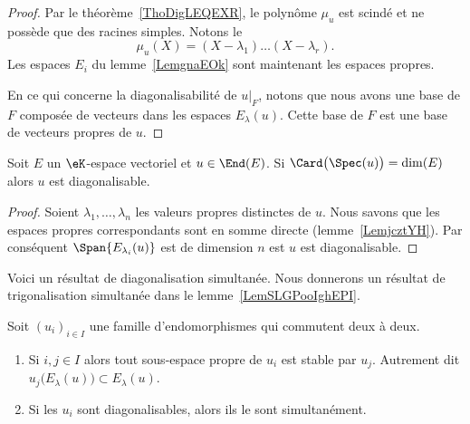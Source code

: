 \begin{proof}
    Par le théorème~\ref{ThoDigLEQEXR}, le polynôme \( \mu_u\) est scindé et ne possède que des racines simples. Notons le
    \begin{equation}
        \mu_u(X)=(X-\lambda_1)\ldots (X-\lambda_r).
    \end{equation}
    Les espaces \( E_i\) du lemme~\ref{LemgnaEOk} sont maintenant les espaces propres.

    En ce qui concerne la diagonalisabilité de \( u|_F\), notons que nous avons une base de \( F\) composée de vecteurs dans les espaces \( E_{\lambda}(u)\). Cette base de \( F\) est une base de vecteurs propres de \( u\).
\end{proof}

\begin{lemma}
    Soit \( E\) un \( \eK\)-espace vectoriel et \( u\in\End(E)\). Si \( \Card\big( \Spec(u) \big)=\dim(E)\) alors \( u\) est diagonalisable.
\end{lemma}

\begin{proof}
    Soient \( \lambda_1,\ldots, \lambda_n\) les valeurs propres distinctes de \( u\). Nous savons que les espaces propres correspondants sont en somme directe (lemme~\ref{LemjcztYH}). Par conséquent \( \Span\{ E_{\lambda_i}(u) \}\) est de dimension \( n\) est \( u\) est diagonalisable.
\end{proof}

Voici un résultat de diagonalisation simultanée. Nous donnerons un résultat de trigonalisation simultanée dans le lemme~\ref{LemSLGPooIghEPI}.
\begin{proposition}     \label{PropGqhAMei}
    Soit \( (u_i)_{i\in I}\) une famille d'endomorphismes qui commutent deux à deux.
    \begin{enumerate}
        \item       \label{ItemGqhAMei}
            Si \( i,j\in I\) alors tout sous-espace propre de \( u_i\) est stable par \( u_j\). Autrement dit \( u_j\big(E_{\lambda}(u)\big)\subset E_{\lambda}(u)\).
        \item
            Si les \( u_i\) sont diagonalisables, alors ils le sont simultanément.
    \end{enumerate}
\end{proposition}

